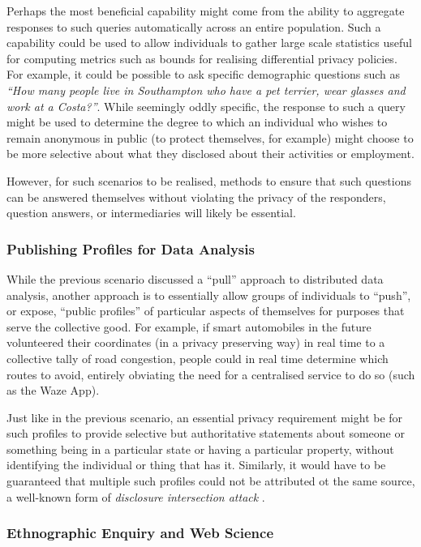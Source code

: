 \documentclass[letterpaper]{sig-alternate}
\begin{document}
Perhaps the most beneficial capability might come from the ability to aggregate responses to such queries automatically across an entire population.  Such a capability could be used to allow individuals to gather large scale statistics useful for computing metrics such as bounds for realising differential privacy \cite{dwork2006differential} policies.  For example, it could be possible to ask specific demographic questions such as \emph{``How many people live in Southampton who have a pet terrier, wear glasses and work at a Costa?''}.  While seemingly oddly specific, the response to such a query might be used to determine the degree to which an individual who wishes to remain anonymous in public (to protect themselves, for example) might choose to be more selective about what they disclosed about their activities or employment.

However, for such scenarios to be realised, methods to ensure that such questions can be answered themselves without violating the privacy of the responders, question answers, or intermediaries will likely be essential. 

\subsubsection{Publishing Profiles for Data Analysis}

While the previous scenario discussed a ``pull'' approach to distributed data analysis, another approach is to essentially allow groups of individuals to ``push'', or expose, ``public profiles'' of particular aspects of themselves for purposes that serve the collective good.  For example, if smart automobiles in the future volunteered their coordinates (in a privacy preserving way) in real time to a collective tally of road congestion, people could in real time determine which routes to avoid, entirely obviating the need for a centralised service to do so (such as the Waze App\cite{blatt2013technological}). 

Just like in the previous scenario, an essential privacy requirement might be for such profiles to provide selective but authoritative statements about someone or something being in a particular state or having a particular property, without identifying the individual or thing that has it.  Similarly, it would have to be guaranteed that multiple such profiles could not be attributed ot the same source, a well-known form of \emph{disclosure intersection attack} \cite{danezis2005statistical}.

\subsubsection{Ethnographic Enquiry and Web Science}
\end{document}
